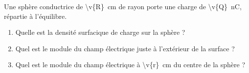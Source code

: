Une sphère conductrice de \qty{\v{R}}{cm} de rayon porte une charge de \qty{\v{Q}}{\nano\coulomb}, répartie à l'équilibre.

\begin{enumerate}[label=\alph*)]
    \item Quelle est la densité surfacique de charge sur la sphère ?
    \item Quel est le module du champ électrique juste à l'extérieur de la surface ?
    \item Quel est le module du champ électrique à \qty{\v{r}}{cm} du centre de la sphère ?
\end{enumerate}
